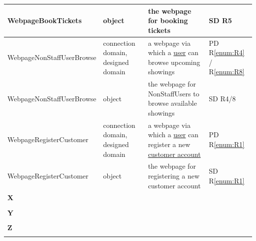 \documentclass[a4paper,10pt,titlepage,bibtotoc,bibtotocnumbered]{scrreprt}
\begin{document}
\begin{longtable}{|l|p{3cm}|p{5cm}|l|}
\hline
WebpageBookTickets & object & the webpage for booking tickets & SD R5\\
\hline
\hypertarget{glossary:WebpageNonStaffUserBrowse}{WebpageNonStaffUserBrowse} & connection domain, designed domain & a webpage via which a \hyperlink{glossary:NonStaffUser}{user} can browse upcoming showings & PD R\ref{enum:R4} / R\ref{enum:R8}\\
\hline
WebpageNonStaffUserBrowse & object & the webpage for NonStaffUsers to browse available showings & SD R4/8\\
\hline
\hypertarget{glossary:WebpageRegisterCustomer}{WebpageRegisterCustomer} & connection domain, designed domain & a webpage via which a \hyperlink{glossary:User}{user} can register a new \hyperlink{glossary:Customer}{customer account} & PD R\ref{enum:R1}\\
\hline
WebpageRegisterCustomer & object & the webpage for registering a new customer account & SD R\ref{enum:R1}\\
\hline
\multicolumn{4}{|l|}{\textbf{X}}\\
\hline
&  &  & \\
\hline
\multicolumn{4}{|l|}{\textbf{Y}}\\
\hline
&  &  & \\
\hline
\multicolumn{4}{|l|}{\textbf{Z}}\\
\hline
&  &  & \\
\hline
\end{longtable}
\end{document}
